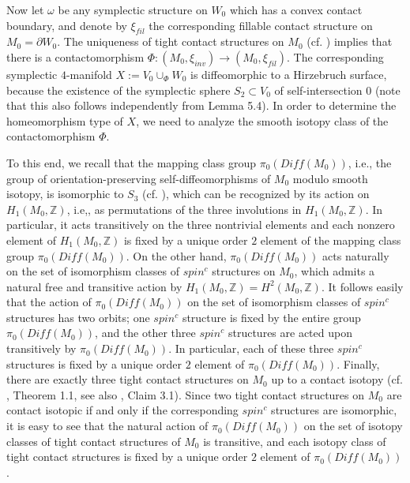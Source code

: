 \documentclass[11pt]{amsart}
\theoremstyle{plain}
\numberwithin{theorem}{section}
\theoremstyle{definition}
\newcommand{\Z}{{\mathbb Z}}
\begin{document}
\vspace{2mm}

Now let $\omega$ be any symplectic structure on $W_0$ which has a convex contact boundary,
and denote by $\xi_{fil}$ the corresponding fillable contact structure on $M_0=\partial W_0$. 
The uniqueness of tight contact structures on $M_0$ (cf. \cite{GLS}) implies that there is a contactomorphism $\Phi: (M_0,\xi_{inv})\rightarrow (M_0,\xi_{fil})$. The corresponding symplectic 
$4$-manifold $X:=V_0\cup_\Phi W_0$ is diffeomorphic to a Hirzebruch surface, because the existence
of the symplectic sphere $S_2\subset V_0$ of self-intersection $0$ (note that this also follows independently from Lemma 5.4). In order to determine the homeomorphism type of $X$, we need to analyze the smooth isotopy class of the contactomorphism $\Phi$. 

To this end, we recall that the mapping class group $\pi_0(Diff(M_0))$, i.e., the group of orientation-preserving self-diffeomorphisms of $M_0$ modulo smooth isotopy, is isomorphic to $S_3$ (cf. \cite{P}), which can be recognized by its action on $H_1(M_0,\Z)$, i.e,, as permutations of the three involutions in $H_1(M_0,\Z)$. In particular, it acts transitively on the three nontrivial elements and each nonzero element of $H_1(M_0,\Z)$ is fixed by a unique order $2$ element of the mapping class group $\pi_0(Diff(M_0))$. On the other hand, $\pi_0(Diff(M_0))$ acts naturally on the set of isomorphism classes of $spin^c$ structures on $M_0$, which admits a natural free and transitive action by 
$H_1(M_0,\Z)=H^2(M_0,\Z)$. It follows easily that the action of $\pi_0(Diff(M_0))$ on the set of isomorphism classes of $spin^c$ structures has two orbits; one $spin^c$ structure is fixed by the entire group $\pi_0(Diff(M_0))$, and the other three $spin^c$ structures are acted upon transitively by 
$\pi_0(Diff(M_0))$. In particular, each of these three $spin^c$ structures is fixed by a unique order $2$ element of $\pi_0(Diff(M_0))$. Finally, there are exactly three tight contact structures on $M_0$ up to a contact isotopy (cf. \cite{GLS}, Theorem 1.1, see also \cite{Ma}, Claim 3.1). Since two tight contact structures on $M_0$ are contact isotopic if and only if the corresponding $spin^c$ structures are isomorphic, it is easy to see that the natural action of $\pi_0(Diff(M_0))$ on the set of isotopy classes of tight contact structures of $M_0$ is transitive, and each isotopy class of tight contact structures is fixed 
by a unique order $2$ element of $\pi_0(Diff(M_0))$.
\end{document}

